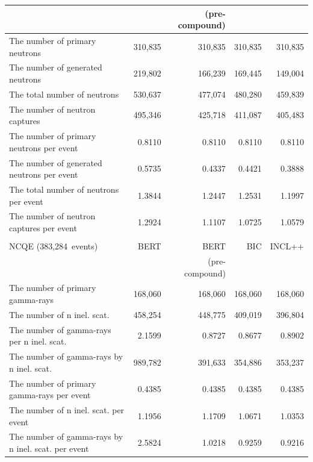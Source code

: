 \begin{table}[h]
\begin{tabular}{lrrrr}
		                                                    &         & (pre-compound) &         &         \\ \hline
		The number of primary neutrons                      & 310,835 &        310,835 & 310,835 & 310,835 \\
		The number of generated neutrons                    & 219,802 &        166,239 & 169,445 & 149,004 \\
		The total number of neutrons                        & 530,637 &        477,074 & 480,280 & 459,839 \\
		The number of neutron captures                      & 495,346 &        425,718 & 411,087 & 405,483 \\ \hline
		The number of primary neutrons per event            &  0.8110 &         0.8110 &  0.8110 &  0.8110 \\
		The number of generated neutrons per event          &  0.5735 &         0.4337 &  0.4421 &  0.3888 \\
		The total number of neutrons per event              &  1.3844 &         1.2447 &  1.2531 &  1.1997 \\
		The number of neutron captures per event            &  1.2924 &         1.1107 &  1.0725 &  1.0579 \\ \hline \hline
		&&& \\ \hline \hline
		NCQE (383,284~events)                               &    BERT &           BERT &     BIC &  INCL++ \\
		                                                    &         & (pre-compound) &         &         \\ \hline
		The number of primary gamma-rays                    & 168,060 &        168,060 & 168,060 & 168,060 \\
		The number of n inel. scat.                         & 458,254 &        448,775 & 409,019 & 396,804 \\
		The number of gamma-rays per n inel. scat.          &  2.1599 &         0.8727 &  0.8677 &  0.8902 \\
		The number of gamma-rays by n inel. scat.           & 989,782 &        391,633 & 354,886 & 353,237 \\ \hline
		The number of primary gamma-rays per event          &  0.4385 &         0.4385 &  0.4385 &  0.4385 \\
		The number of n inel. scat. per event               &  1.1956 &         1.1709 &  1.0671 &  1.0353 \\
		The number of gamma-rays by n inel. scat. per event &  2.5824 &         1.0218 &  0.9259 &  0.9216 \\ \hline \hline
	\end{tabular}
\end{table}





